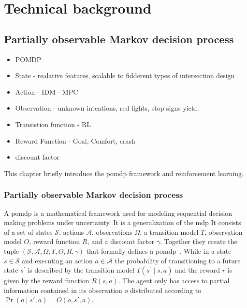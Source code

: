 \chapter{Technical background}\label{chapter:background}
%

\section{Partially observable Markov decision process}\label{section:pomdp}

\begin{itemize}
    \item POMDP
    \item State - realative features, scalable to fidderent types of intersection design 
    \item Action - IDM - MPC
    \item Observation - unknown intentions, red lights, stop signs yield. 
    \item Transistion function - RL 
    \item Reward Function - Goal, Comfort, crash
    \item discount factor 
\end{itemize}



This chapter briefly introduce the \gls{pomdp} framework and reinforcement learning.  


\subsection{Partially observable Markov decision process}
A \gls{pomdp} is a mathematical framework used for modeling sequential decision making problems under uncertainty. 
It is a generalization of the \gls{mdp}
It consists of a set of states $\mathcal{S}$, actions $\mathcal{A}$, observations $\Omega$, a transition model $T$, observation model $O$, reward function $R$, and a discount factor $\gamma$. 
Together they create the tuple $(\mathcal{S},\mathcal{A},\Omega,T,O,R,\gamma)$ that formally defines a \gls{pomdp}~\cite{Kochenderfer2015}. 
While in a state $s \in \mathcal{S}$ and executing an action $a \in \mathcal{A}$ the probability of transitioning to a future state $s^\prime$ is described by the transition model $T(s^\prime \mid s,a)$ and the reward $r$ is given by the reward function $R(s,a)$. 
The agent only has access to partial information contained in its observation $o$ distributed according to $\Pr(o \mid s', a) = O(o, s', a)$.

